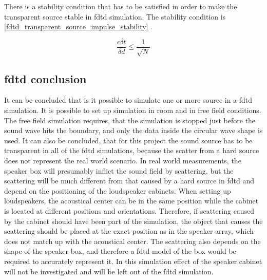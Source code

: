 There is a stability condition that has to be satisfied in order to make the transparent source  stable in \gls{fdtd} simulation. The stability condition is \autoref{fdtd_transparent_source_impulse_stability} \citep{FDTDtransparent}. 


\begin{equation}\label{fdtd_transparent_source_impulse_stability}
\frac{c \delta t}{\delta d} \leq \frac{1}{\sqrt{N}}
\end{equation}

        \startexplain
    \stopexplain
    
    
\subsection{\gls{fdtd} conclusion}
It can be concluded that is it possible to simulate one or more source in a \gls{fdtd} simulation. It is possible to set up simulation in room and in free field conditions. The free field simulation requires, that the simulation is stopped just before the sound wave hits the boundary, and only the data inside the circular wave shape is used. It can also be concluded, that for this project the sound source has to be transparent in all of the \gls{fdtd} simulations, because the scatter from a hard source does not represent the real world scenario. In real world measurements, the speaker box will presumably inflict the sound field by scattering, but the scattering will be much different from that caused by a hard source in \gls{fdtd} and depend on the positioning of the loudspeaker cabinets. When setting up loudspeakers, the acoustical center can be in the same position while the cabinet is located at different positions and orientations. Therefore, if scattering caused by the cabinet should have been part of the simulation, the object that causes the scattering should be placed at the exact position as in the speaker array, which does not match up with the acoustical center. The scattering also depends on the shape of the speaker box, and therefore a \gls{fdtd} model of the box would be required to accurately represent it. In this simulation effect of the speaker cabinet will not be investigated and will be left out of the \gls{fdtd} simulation.


